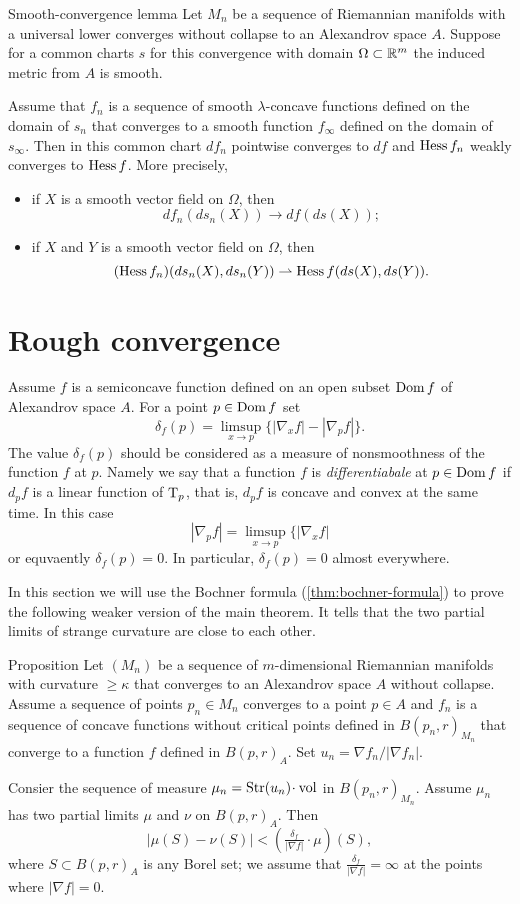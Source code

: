 \begin{thm}{Smooth-convergence lemma}\label{lem:smooth-covergence}
Let $M_n$ be a sequence of Riemannian manifolds with a universal lower converges without collapse to an Alexandrov space $A$.
Suppose for a common charts $s$ for this convergence with domain $\Omega\subset\mathbb{R}^m$ the induced metric from $A$ is smooth.

Assume that $f_n$ is a sequence of smooth $\lambda$-concave functions defined on the domain of $s_n$ that converges to a smooth function $f_\infty$ defined on the domain of $s_\infty$.
Then in this common chart $df_n$ pointwise converges to $df$ and
$\operatorname{Hess} f_n$ weakly converges to $\operatorname{Hess} f$.
More precisely, 
\begin{itemize}
\item if $X$ is a smooth vector field on $\Omega$, then 
\[df_n(ds_n(X))\to df(ds(X));\]
\item if $X$ and $Y$ is a smooth vector field on $\Omega$, then 
\[(\operatorname{Hess} f_n)(ds_n(X),ds_n(Y))\rightharpoonup\operatorname{Hess} f(ds(X),ds(Y)).\]
\end{itemize}
\end{thm}

\section{Rough convergence}
\label{sec:rough-convergence}

Assume $f$ is a semiconcave function defined on an open subset $\mathop{\rm Dom} f$ of Alexandrov space $A$.
For a point $p\in \mathop{\rm Dom} f$ set 
\[\delta_f(p)=\limsup_{x\to p}\{|\nabla_x f|-|\nabla_p f|\}.\]
The value $\delta_f(p)$ should be considered as a measure of nonsmoothness of the function $f$ at $p$.
Namely we say that a function $f$ is \emph{differentiabale} at $p\in\mathop{\rm Dom} f$
if $d_pf$ is a linear function of $\text{\rm T}_p$, that is, $d_pf$ is concave and convex at the same time.
In this case %
\[|\nabla_p f|=\limsup_{x\to p}\{|\nabla_x f|\]
or equvaently $\delta_f(p)=0$.
In particular, $\delta_f(p)=0$ almost everywhere. %


In this section we will use the Bochner formula (\ref{thm:bochner-formula}) to prove the following weaker version of the main theorem.
It tells that the two partial limits of strange curvature are close to each other. 

\begin{thm}{Proposition}
Let $(M_n)$ be a sequence of $m$-dimensional Riemannian manifolds with curvature $\ge\kappa$
that converges to an Alexandrov space $A$ without collapse.
Assume a sequence of points $p_n\in M_n$ converges to a point $p\in A$ 
and $f_n$ is a sequence of concave functions without critical points defined in $B(p_n,r)_{M_n}$ that converge to a function $f$ defined in  $B(p,r)_{A}$.
Set $u_n=\nabla f_n/|\nabla f_n|$.  

Consier the sequence of measure $\mu_n=\Str(u_n)\cdot \vol$ in $B(p_n,r)_{M_n}$.
Assume $\mu_n$ has two partial limits $\mu$ and $\nu$ on $B(p,r)_{A}$.
Then 
\[|\mu(S)-\nu(S)|
<
(\tfrac{\delta_f}{|\nabla f|}\cdot\mu)(S),\]
where $S\subset B(p,r)_{A}$ is any Borel set; we assume that $\frac{\delta_f}{|\nabla f|}=\infty$ at the points where $|\nabla f|=0$.
\end{thm}


